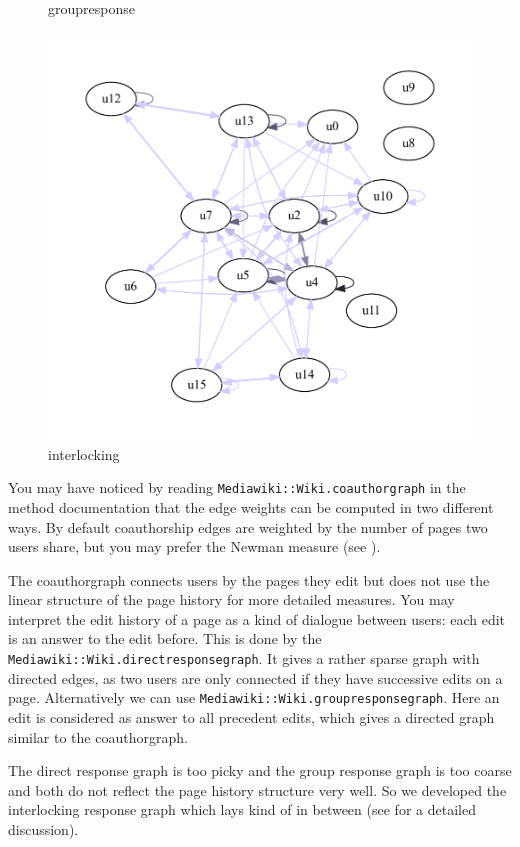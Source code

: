 \documentclass[a4paper]{scrartcl}
\newcommand{\rdoc}[1]{\texttt{\color{help}#1}}
\begin{document}
\begin{figure}
{  \caption{groupresponse}
  \label{fig:gv_grg}}\hfill
  \parbox[b]{.33\textwidth}{
  \includegraphics[width=\linewidth]{gv_ilrg}\vspace{-3ex}
  \caption{interlocking}
  \label{fig:gv_ilrg}}
\end{figure}

You may have noticed by reading \rdoc{Mediawiki::Wiki.coauthorgraph}
in the method documentation that the edge weights can be computed in
two different ways. By default coauthorship edges are weighted by the
number of pages two users share, but you may prefer the Newman measure
(see \cite{Newman:2001zr,Newman:2001mz}).

The coauthorgraph connects users by the pages they edit but does not
use the linear structure of the page history for more detailed
measures. You may interpret the edit history of a page as a kind of
dialogue between users: each edit is an answer to the edit
before. This is done by the
\rdoc{Mediawiki::Wiki.directresponsegraph}.  It gives a rather sparse
graph with directed edges, as two users are only connected if they
have successive edits on a page.  Alternatively we can use
\rdoc{Mediawiki::Wiki.groupresponsegraph}. Here an edit is considered
as answer to all precedent edits, which gives a directed graph similar
to the coauthorgraph.

The direct response graph is too picky and the group response graph
is too coarse and both do not reflect the page history structure very
well. So we developed the interlocking response graph which lays kind of
in between (see \cite{Stein/Blaschke:2009a,Blaschke/Stein:2007} for a
detailed discussion).
\end{document}
